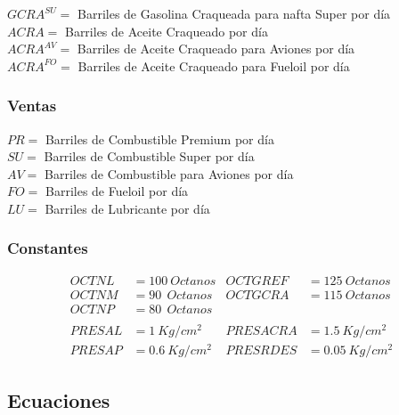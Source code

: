 \documentclass[a4paper,10pt]{article}
\begin{document}
$GCRA^{SU} = $ Barriles de Gasolina Craqueada para nafta Super por d\'ia \\

$ACRA = $ Barriles de Aceite Craqueado por d\'ia \\

$ACRA^{AV} = $ Barriles de Aceite Craqueado para Aviones por d\'ia \\

$ACRA^{FO} = $ Barriles de Aceite Craqueado para Fueloil por d\'ia \\
\vspace{2mm}

\subsubsection{Ventas}
\vspace{5mm}

$PR = $ Barriles de Combustible Premium por d\'ia \\

$SU = $ Barriles de Combustible Super por d\'ia \\

$AV = $ Barriles de Combustible para Aviones por d\'ia \\

$FO = $ Barriles de Fueloil por d\'ia \\

$LU = $ Barriles de Lubricante por d\'ia \\
\vspace{2mm}

\subsubsection{Constantes}
\begin{align*}
OCTNL &= 100 \ Octanos	& OCTGREF &= 125 \ Octanos \\
OCTNM &= 90 \ \ Octanos	& OCTGCRA &= 115 \ Octanos \\
OCTNP &= 80 \ \ Octanos	& \\
\\
PRESAL &= 1 \ Kg/cm^{2} & PRESACRA &= 1.5 \ Kg/cm^{2} \\
PRESAP &= 0.6 \ Kg/cm^{2} & PRESRDES &= 0.05 \ Kg/cm^{2}
\end{align*}

\subsection{Ecuaciones}
\end{document}
